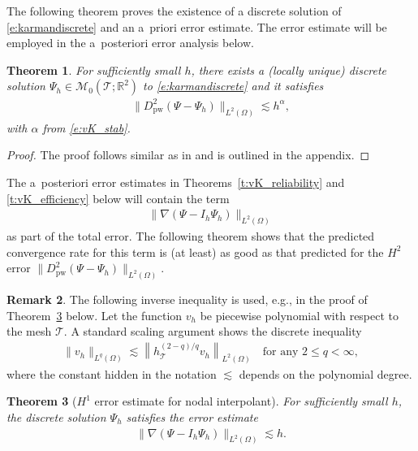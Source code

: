 \documentclass[a4paper]{amsart}
\newtheorem{theorem}{Theorem}
\theoremstyle{definition}
\newtheorem{remark}[theorem]{Remark}
\numberwithin{equation}{section}
\numberwithin{theorem}{section}
\newcommand{\R}{\mathbb{R}}
\newcommand{\pw}{\mathrm{pw}}
\newcommand{\tri}{\mathcal{T}}
\begin{document}
The following theorem proves the existence of a discrete
solution of \eqref{e:karmandiscrete} and an a~priori error estimate. 
The error estimate will be employed in the 
a~posteriori error analysis below.

\begin{theorem}\label{t:vK_apriori}
    For sufficiently small $h$, there exists a (locally unique) discrete 
    solution $\Psi_h\in \mathcal{M}_0(\tri;\R^2)$ to 
    \eqref{e:karmandiscrete} and it satisfies 
    \begin{align*}
        \lVert D^2_\pw (\Psi-\Psi_h )\rVert_{L^2(\Omega)}
        \lesssim h^\alpha,
    \end{align*}
    with $\alpha$ from \eqref{e:vK_stab}.
\end{theorem}

\begin{proof}
    The proof follows similar as in \cite{MallikNataraj2016} 
    and is outlined in the appendix.
\end{proof}

The a~posteriori error estimates in Theorems~\ref{t:vK_reliability}
and \ref{t:vK_efficiency} below will contain the term 
\begin{align*}
    \lVert\nabla(\Psi-I_h\Psi_h)\rVert_{L^2(\Omega)}
\end{align*}
as part of the total error.
The following theorem shows that the predicted convergence rate
for this term is (at least) as good as that predicted for the $H^2$ error 
$\lVert D^2_\pw (\Psi-\Psi_h)\rVert_{L^2(\Omega)}$.


\begin{remark}
    The following inverse inequality is used, e.g., in the
    proof of Theorem~\ref{t:a_priori_nodal_interpol} below.
    Let the function $v_h$ be piecewise polynomial with respect to the mesh
    $\mathcal T$. A standard scaling argument shows the
    discrete inequality
        \begin{align}\label{e:inverse_inequality}
            \lVert v_h\rVert_{L^q(\Omega)}
            \lesssim \left\lVert h_\tri^{(2-q)/q} v_h\right\rVert_{L^2(\Omega)}
            \quad\text{for any }
            2\leq q <\infty,
        \end{align}
    where the constant hidden in the notation $\lesssim$ depends on the
    polynomial degree.
\end{remark}



\begin{theorem}[$H^1$ error estimate for nodal interpolant]
    \label{t:a_priori_nodal_interpol}
    For sufficiently small $h$, the discrete solution $\Psi_h$ 
    satisfies the error estimate 
    \begin{align*}
        \lVert\nabla(\Psi-I_h\Psi_h)\rVert_{L^2(\Omega)}
        \lesssim h.
    \end{align*}
\end{theorem}
\end{document}
